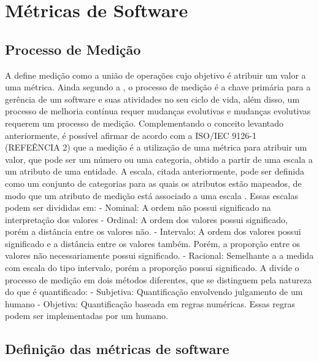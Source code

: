 \chapter{Métricas de Software}
\label{chap:metricas}

\section{Processo de Medição}

A  define medição como a união de operações cujo objetivo é atribuir um valor a uma métrica. Ainda segundo a , o processo de medição é a chave primária para a gerência de um software e suas atividades no seu ciclo de vida, além disso, um processo de melhoria contínua requer mudanças evolutivas e mudanças evolutivas requerem um processo de medição.
	Complementando o conceito levantado anteriormente, é possível afirmar de acordo com a ISO/IEC 9126-1 (REFEÊNCIA 2)  que a medição é a utilização de uma métrica para  atribuir um valor, que pode ser um número ou uma categoria, obtido a partir de uma escala a um atributo de uma entidade.
	A escala, citada anteriormente, pode ser definida como um conjunto de categorias para as quais os atributos estão mapeados, de modo que um atributo de medição está associado a uma escala . Essas escalas podem ser divididas em:	
	- Nominal: A ordem não possui significado na interpretação dos valores \cite{Meirelles2013}
	- Ordinal: A ordem dos valores possui significado, porém a distância entre os valores não. \cite{Meirelles2013}
	-  Intervalo:  A ordem dos valores possui significado e a distância entre os valores também. Porém, a proporção entre os valores não necessariamente possui significado. \cite{Meirelles2013}
	- Racional: Semelhante a a medida com escala do tipo intervalo, porém a proporção possui significado. \cite{Meirelles2013}
	A  divide o processo de medição em dois métodos diferentes, que se distinguem pela natureza do que é quantificado:
	- Subjetiva: Quantificação envolvendo julgamento de um humano
	- Objetiva: Quantificação baseada em regras numéricas. Essas regras podem ser implementadas por um humano.




\section{Definição das métricas de software}

